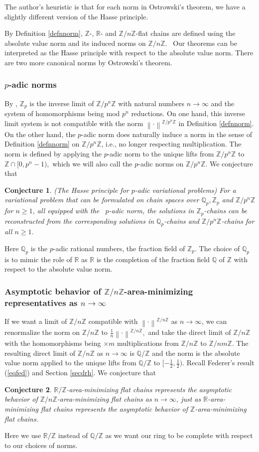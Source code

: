 \documentclass[11pt,a4paper]{amsart}
\numberwithin{equation}{section}
\newcommand{\no}[1]{\left\lVert#1\right\rVert}
\newcommand{\R}{\mathbb{R}}
\newcommand{\Z}{\mathbb{Z}}
\newcommand{\Q}{\mathbb{Q}}
\theoremstyle{plain}
\newtheorem{conj}{Conjecture}
\theoremstyle{definition}
\numberwithin{equation}{subsection}
\begin{document}
The author's heuristic is that for each norm in Ostrowski's theorem, we have a slightly different version of the Hasse principle.

By Definition \ref{defnnorm}, $\Z$-, $\R$- and $\Z/n\Z$-flat chains are defined using the absolute value norm and its induced norms on $\Z/n\Z.$  Our theorems can be interpreted as the Hasse principle with respect to the absolute value norm. There are two more canonical norms by Ostrowski's theorem.
\subsubsection{$p$-adic norms}
By \cite[Chapter II.1.1]{JSca}, $\Z_p$ is the inverse limit of $\Z/p^n\Z$ with natural numbers $n\to\infty$ and the system of homomorphisms being mod $p^n$ reductions. On one hand, this inverse limit system is not compatible with the norm $\no{\cdot}^{\Z/p^n\Z}$ in Definition \ref{defnnorm}. On the other hand, the $p$-adic norm does naturally induce a norm in the sense of Definition \ref{defnnorm} on $\Z/p^n\Z$, i.e., no longer respecting multiplication. The norm is defined by applying the $p$-adic norm to the unique lifts from $\Z/p^n\Z$ to $ \Z\cap[0,p^n-1),$ which we will also call the $p$-adic norms on $\Z/p^n\Z$. We conjecture that
\begin{conj}
	(The Hasse principle for $p$-adic variational problems) For a variational problem that can be formulated on chain spaces over $\Q_p,\Z_p$ and $\Z/p^n\Z$ for $n\ge 1$, all equipped with the  $p$-adic norm, the solutions in $\Z_p$-chains can be reconstructed from the corresponding solutions in $\Q_p$-chains and $\Z/p^n\Z$-chains for all $n\ge 1$.  
\end{conj} 
Here $\Q_p$ is the $p$-adic rational numbers, the fraction field of $\Z_p$. The choice of $\Q_p$ is to mimic the role of $\R$ as $\R$ is the completion of the fraction field $\Q$ of $\Z$ with respect to the absolute value norm.
\subsubsection{Asymptotic behavior of $\Z/n\Z$-area-minimizing representatives as $n\to\infty$}
If we want a limit of $\Z/n\Z$ compatible with $\no{\cdot}^{\Z/n\Z}$ as $n\to\infty$, we can renormalize the norm on $\Z/n\Z$ to $\frac{1}{n}\no{\cdot}^{\Z/n\Z},$ and take the direct limit of $\Z/n\Z$ with the homomorphisms being $\times m$ multiplications from $\Z/n\Z$ to $\Z/nm\Z.$ The resulting direct limit of $\Z/n\Z$ as $n\to\infty$ is $\Q/\Z$ and the norm is the absolute value norm applied to the unique lifts from $\Q/\Z$ to $[-\frac{1}{2},\frac{1}{2}).$ Recall Federer's result (\ref{eqfed}) and Section \ref{secdrh}. We conjecture that
\begin{conj}
	$\R/\Z$-area-minimizing flat chains represents the asymptotic behavior of $\Z/n\Z$-area-minimizing flat chains as $n\to\infty$, just as $\R$-area-minimizing flat chains represents the asymptotic behavior of $\Z$-area-minimizing flat chains.
\end{conj}
Here we use $\R/\Z$ instead of $\Q/\Z$ as we want our ring to be complete with respect to our choices of norms.
\end{document}
